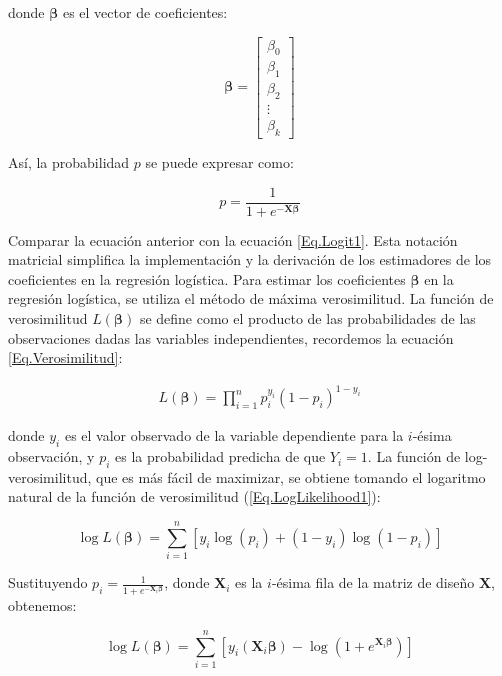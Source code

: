 \documentclass[a4paper]{report} %
\begin{document}
donde $\boldsymbol{\beta}$ es el vector de coeficientes:

\begin{equation}
\boldsymbol{\beta} = \begin{bmatrix}
\beta_0 \\
\beta_1 \\
\beta_2 \\
\vdots \\
\beta_k
\end{bmatrix}
\end{equation}

As\'i, la probabilidad $p$ se puede expresar como:

\begin{equation}\label{Eq.Logit2}
p = \frac{1}{1 + e^{-\mathbf{X} \boldsymbol{\beta}}}
\end{equation}

Comparar la ecuaci\'on anterior con la ecuaci\'on \ref{Eq.Logit1}. Esta notaci\'on matricial simplifica la implementaci\'on y la derivaci\'on de los estimadores de los coeficientes en la regresi\'on log\'istica. Para estimar los coeficientes $\boldsymbol{\beta}$ en la regresi\'on log\'istica, se utiliza el m\'etodo de m\'axima verosimilitud. La funci\'on de verosimilitud $L(\boldsymbol{\beta})$ se define como el producto de las probabilidades de las observaciones dadas las variables independientes, recordemos la ecuaci\'on \ref{Eq.Verosimilitud}:

\begin{eqnarray}
L(\boldsymbol{\beta}) = \prod_{i=1}^{n} p_i^{y_i} (1 - p_i)^{1 - y_i}
\end{eqnarray}


donde $y_i$ es el valor observado de la variable dependiente para la $i$-\'esima observaci\'on, y $p_i$ es la probabilidad predicha de que $Y_i = 1$.  La funci\'on de log-verosimilitud, que es m\'as f\'acil de maximizar, se obtiene tomando el logaritmo natural de la funci\'on de verosimilitud (\ref{Eq.LogLikelihood1}):

\begin{equation}
\log L(\boldsymbol{\beta}) = \sum_{i=1}^{n} \left[ y_i \log(p_i) + (1 - y_i) \log(1 - p_i) \right]
\end{equation}

Sustituyendo $p_i = \frac{1}{1 + e^{-\mathbf{X}_i \boldsymbol{\beta}}}$, donde $\mathbf{X}_i$ es la $i$-\'esima fila de la matriz de dise\~no $\mathbf{X}$, obtenemos:

\begin{equation}\label{Eq.LogLikelihood2}
\log L(\boldsymbol{\beta}) = \sum_{i=1}^{n} \left[ y_i (\mathbf{X}_i \boldsymbol{\beta}) - \log(1 + e^{\mathbf{X}_i \boldsymbol{\beta}}) \right]
\end{equation}
\end{document}
